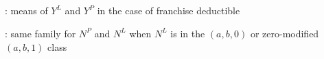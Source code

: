 \subsection*{}
\item {}: means of \(Y^L\) and \(Y^P\) in the case of franchise deductible
\item {}: same family for \(N^P\) and \(N^L\) when \(N^L\) is in the \((a,b,0)\) or zero-modified \((a,b,1)\) class
